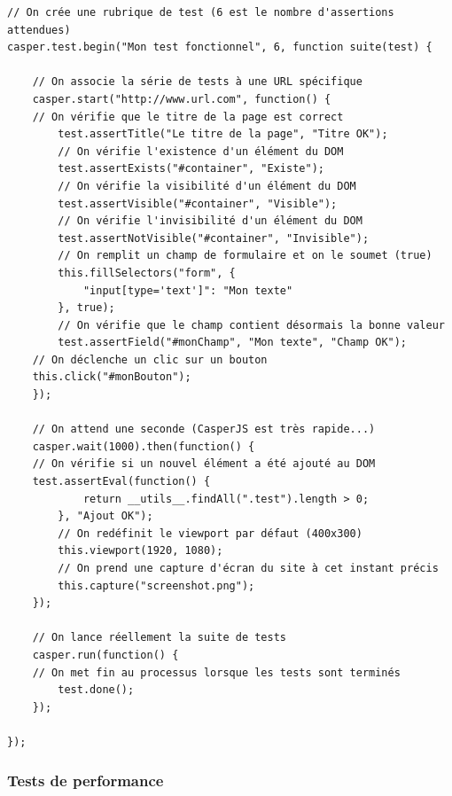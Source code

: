 \documentclass[a4paper,12pt]{article}
\begin{document}
\begin{lstlisting}
// On crée une rubrique de test (6 est le nombre d'assertions attendues)
casper.test.begin("Mon test fonctionnel", 6, function suite(test) {

    // On associe la série de tests à une URL spécifique
    casper.start("http://www.url.com", function() {
	// On vérifie que le titre de la page est correct
        test.assertTitle("Le titre de la page", "Titre OK");
        // On vérifie l'existence d'un élément du DOM
        test.assertExists("#container", "Existe");
        // On vérifie la visibilité d'un élément du DOM
        test.assertVisible("#container", "Visible");
        // On vérifie l'invisibilité d'un élément du DOM
        test.assertNotVisible("#container", "Invisible");
        // On remplit un champ de formulaire et on le soumet (true)
        this.fillSelectors("form", {
            "input[type='text']": "Mon texte"
        }, true);
        // On vérifie que le champ contient désormais la bonne valeur
        test.assertField("#monChamp", "Mon texte", "Champ OK");
	// On déclenche un clic sur un bouton
	this.click("#monBouton");
    });
    
    // On attend une seconde (CasperJS est très rapide...)
    casper.wait(1000).then(function() {
	// On vérifie si un nouvel élément a été ajouté au DOM
	test.assertEval(function() {
            return __utils__.findAll(".test").length > 0;
        }, "Ajout OK");
        // On redéfinit le viewport par défaut (400x300)
        this.viewport(1920, 1080);
        // On prend une capture d'écran du site à cet instant précis
        this.capture("screenshot.png");
    });
    
    // On lance réellement la suite de tests
    casper.run(function() {
	// On met fin au processus lorsque les tests sont terminés
        test.done();
    });
    
});
\end{lstlisting}

\subsubsection{Tests de performance}
\end{document}
